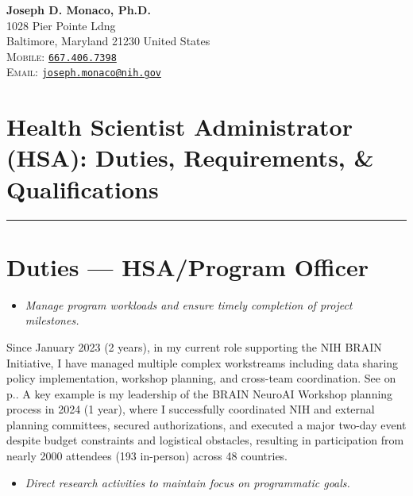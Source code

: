 \documentclass[10pt]{article}
\newcommand{\cf}[1]{\textcolor{hopkinsblue}{See \emph{\nameref{sec:#1}} on p.\pageref{sec:#1}}}
\begin{document}
\begin{center}
  \textbf{\LARGE\color{hopkinsblue} Joseph D. Monaco, Ph.D.} \\[0.1in]
  1028 Pier Pointe Ldng \\
  Baltimore, Maryland 21230 United States \\
  \textsc{Mobile:} \href{tel:16674067398}{\color{hopkinsblue}\texttt{667.406.7398}} \\
  \textsc{Email:} \href{mailto:joseph.monaco@nih.gov}{\color{hopkinsblue}\texttt{joseph.monaco@nih.gov}}
  \vspace{.1in}
\end{center}

\vspace{-.2in}
\section*{Health Scientist Administrator (HSA): Duties, Requirements, \& Qualifications}
\vspace{-.1in}
\hrule
\vspace{.1in}

\section*{Duties --- HSA/Program Officer}
\label{sec:duties}

\begin{itemize}
  \color{hopkinsblue}
  \item \emph{Manage program workloads and ensure timely completion of project
milestones.}
\end{itemize}

Since January 2023 (2 years), in my current role supporting the NIH BRAIN
Initiative, I have managed multiple complex workstreams including data sharing
policy implementation, workshop planning, and cross-team coordination.
\cf{jobobd}. A key example is my leadership of the BRAIN NeuroAI Workshop
planning process in 2024 (1 year), where I successfully coordinated NIH and
external planning committees, secured authorizations, and executed a major
two-day event despite budget constraints and logistical obstacles, resulting in
participation from nearly 2000 attendees (193 in-person) across 48 countries.

\begin{itemize}
  \color{hopkinsblue}
  \item \emph{Direct research activities to maintain focus on programmatic
goals.}
\end{itemize}
\end{document}

